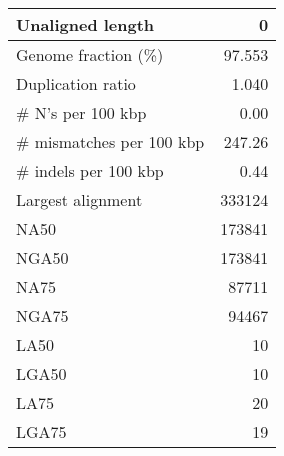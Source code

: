 \documentclass[12pt,a4paper]{article}
\begin{document}
\begin{table}[ht]
\begin{center}
\begin{tabular}{|l*{1}{|r}|}
Unaligned length & 0 \\ \hline
Genome fraction (\%) & 97.553 \\ \hline
Duplication ratio & 1.040 \\ \hline
\# N's per 100 kbp & 0.00 \\ \hline
\# mismatches per 100 kbp & 247.26 \\ \hline
\# indels per 100 kbp & 0.44 \\ \hline
Largest alignment & 333124 \\ \hline
NA50 & 173841 \\ \hline
NGA50 & 173841 \\ \hline
NA75 & 87711 \\ \hline
NGA75 & 94467 \\ \hline
LA50 & 10 \\ \hline
LGA50 & 10 \\ \hline
LA75 & 20 \\ \hline
LGA75 & 19 \\ \hline
\end{tabular}
\end{center}
\end{table}
\end{document}
